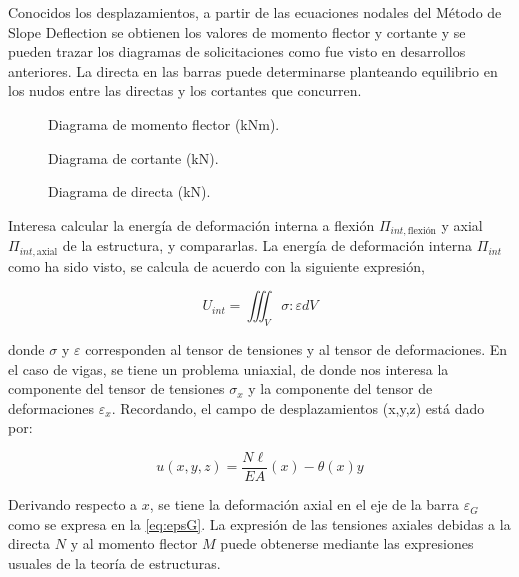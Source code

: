 Conocidos los desplazamientos, a partir de las ecuaciones nodales del Método de Slope Deflection se obtienen los valores de momento flector y cortante y se pueden trazar los diagramas de solicitaciones como fue visto en desarrollos anteriores. La directa en las barras puede determinarse planteando equilibrio en los nudos entre las directas y los cortantes que concurren.  

\begin{figure}[htb]
	\centering
	\def\svgwidth{0.4\textwidth}
	
	\caption{Diagrama de momento flector (kNm).}
\end{figure}
\begin{figure}[htb]
	\centering
	\def\svgwidth{0.4\textwidth}
	
	\caption{Diagrama de cortante (kN).}
\end{figure}

\begin{figure}[h!tb]
	\centering
	\def\svgwidth{0.4\textwidth}
	
	\caption{Diagrama de directa (kN).}
\end{figure}

Interesa calcular la energía de deformación interna a flexión $\Pi_{int,\text{flexión}}$ y axial $\Pi_{int,\text{axial}}$ de la estructura, y compararlas. %
%
La energía de deformación interna $\Pi_{int}$ como ha sido visto, se calcula de acuerdo con la siguiente expresión,

\begin{equation}
	U_{int} = \iiint_{V}\sigma : \varepsilon dV
\end{equation}

donde $\sigma$ y $\varepsilon$ corresponden al tensor de tensiones y al tensor de deformaciones. En el caso de vigas, se tiene un problema uniaxial, de donde nos interesa la componente del tensor de tensiones $\sigma_x$ y la componente del tensor de deformaciones $\varepsilon_x$. Recordando, el campo de desplazamientos \bfu(x,y,z) está dado por:

$$
u(x,y,z) = \frac{N\ell}{EA}(x) - \theta(x) y 
$$

Derivando respecto a $x$, se tiene la deformación axial en el eje de la barra $\varepsilon_G$ como se expresa en la \autoref{eq:epsG}. La expresión de las tensiones axiales debidas a la directa $N$ y al momento flector $M$ puede obtenerse mediante las expresiones usuales de la teoría de estructuras. 

